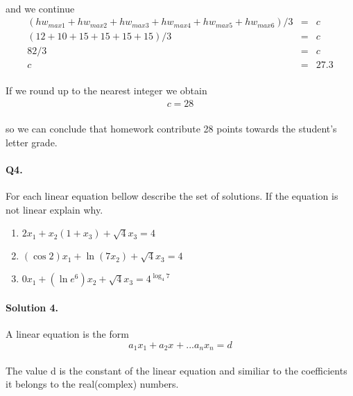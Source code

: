 \documentclass[11pt]{article}
\begin{document}
\paragraph{}and we continue
\begin{eqnarray*}
(hw_{max1} + hw_{max2} + hw_{max3} + hw_{max4} + hw_{max5} + hw_{max6})/3 &=& c
\\(12+10+15+15+15+15)/3&=&c
\\82/3&=&c
\\c&=&27.3
\end{eqnarray*}
\paragraph{}If we round up to the nearest integer we obtain
\begin{eqnarray*}
c=28
\end{eqnarray*}

\paragraph{}so we can conclude that homework contribute 28 points towards the student's letter grade.

\paragraph{Q4.} For each linear equation bellow describe the set of solutions.
If the equation is not linear explain why.
\begin{enumerate}
\item \(2 x_1 + x_2(1+x_3) + \sqrt{4}x_3= 4\)
\item \((\cos 2) x_1 + \ln (7x_2) + \sqrt{4}x_3= 4\)
\item \(0 x_1 + (\ln e^6) x_2 + \sqrt{4}x_3= 4^{\log_4 7}\)
\end{enumerate}

\paragraph{Solution 4.}A linear equation is the form
\begin{equation}
a_{1} x_{1} + a_{2} x_{} + ... a_{n} x_{n}=d
\end{equation}
\paragraph{}The value d is the constant of the linear equation and similiar to the coefficients it belongs to the real(complex) numbers.
\end{document}
